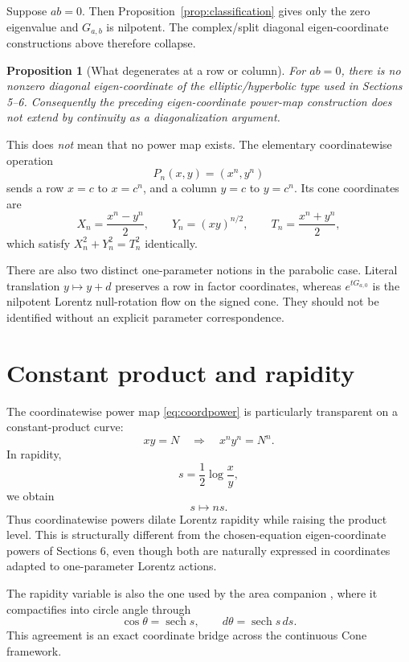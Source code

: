 \documentclass[11pt]{amsart}
\newtheorem{proposition}[theorem]{Proposition}
\theoremstyle{remark}
\begin{document}
Suppose $ab=0$.  Then Proposition~\ref{prop:classification} gives only the zero eigenvalue and $G_{a,b}$ is nilpotent.  The complex/split diagonal eigen-coordinate constructions above therefore collapse.

\begin{proposition}[What degenerates at a row or column]\label{prop:parabolic}
For $ab=0$, there is no nonzero diagonal eigen-coordinate of the elliptic/hyperbolic type used in Sections 5--6.  Consequently the preceding eigen-coordinate power-map construction does not extend by continuity as a diagonalization argument.
\end{proposition}

This does \emph{not} mean that no power map exists.  The elementary coordinatewise operation
\begin{equation}\label{eq:coordpower}
\boxed{P_n(x,y)=(x^n,y^n)}
\end{equation}
sends a row $x=c$ to $x=c^n$, and a column $y=c$ to $y=c^n$.  Its cone coordinates are
\[
X_n=\frac{x^n-y^n}{2},
\qquad
Y_n=(xy)^{n/2},
\qquad
T_n=\frac{x^n+y^n}{2},
\]
which satisfy $X_n^2+Y_n^2=T_n^2$ identically.

There are also two distinct one-parameter notions in the parabolic case.  Literal translation $y\mapsto y+d$ preserves a row in factor coordinates, whereas $e^{tG_{a,0}}$ is the nilpotent Lorentz null-rotation flow on the signed cone.  They should not be identified without an explicit parameter correspondence.

\section{Constant product and rapidity}

The coordinatewise power map \eqref{eq:coordpower} is particularly transparent on a constant-product curve:
\[
xy=N
\quad\Longrightarrow\quad
x^ny^n=N^n.
\]
In rapidity,
\[
s=\frac12\log\frac{x}{y},
\]
we obtain
\begin{equation}\label{eq:rapiditypower}
\boxed{s\mapsto ns.}
\end{equation}
Thus coordinatewise powers dilate Lorentz rapidity while raising the product level.  This is structurally different from the chosen-equation eigen-coordinate powers of Sections 6, even though both are naturally expressed in coordinates adapted to one-parameter Lorentz actions.

The rapidity variable is also the one used by the area companion \cite{Ebert2026Area}, where it compactifies into circle angle through
\[
\cos\theta=\operatorname{sech}s,
\qquad
d\theta=\operatorname{sech}s\,ds.
\]
This agreement is an exact coordinate bridge across the continuous Cone framework.
\end{document}
